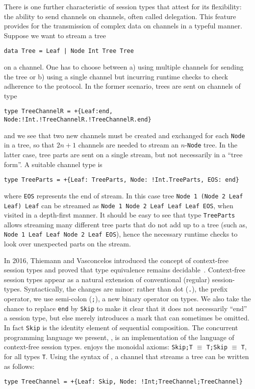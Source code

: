 There is one further characteristic of session types that attest for
its flexibility: the ability to send channels on channels, often called
delegation. This feature provides for the transmission of complex data
on channels in a typeful manner. Suppose we want to stream a tree
%
\begin{lstlisting}
data Tree = Leaf | Node Int Tree Tree
\end{lstlisting}
%
on a channel. One has to choose between a) using multiple channels for
sending the tree or b) using a single channel but incurring runtime
checks to check adherence to the protocol. In the former scenario,
trees are sent on channels of type
%
\begin{lstlisting}[morekeywords=end]
type TreeChannelR = +{Leaf:end, Node:!Int.!TreeChannelR.!TreeChannelR.end}
\end{lstlisting}
%
and we see that two new channels must be created and exchanged for
each \lstinline|Node| in a tree, so that $2n+1$ channels are needed to
stream an $n$-\lstinline|Node| tree.
%
In the latter case, tree parts are sent on a single stream, but not
necessarily in a ``tree form''. A suitable channel type is
%
\begin{lstlisting}[morekeywords=end]
type TreeParts = +{Leaf: TreeParts, Node: !Int.TreeParts, EOS: end}
\end{lstlisting}
%
where \lstinline|EOS| represents the end of stream. In this case tree
\lstinline|Node 1 (Node 2 Leaf Leaf) Leaf| can be streamed as
\lstinline|Node 1 Node 2 Leaf Leaf Leaf EOS|, when visited in a
depth-first manner. It should be easy to see that type
\lstinline|TreeParts| allows streaming many different tree parts that
do not add up to a tree (such as,
%
\lstinline|Node 1 Leaf Leaf Node 2 Leaf EOS|), hence the necessary
runtime checks to look over unexpected parts on the stream.

In 2016, Thiemann and Vasconcelos introduced the concept of
context-free session types and proved that type equivalence remains
decidable~\cite{DBLP:conf/icfp/ThiemannV16}.
%
Context-free session types appear as a natural extension of
conventional (regular) session-types. Syntactically, the changes are
minor: rather than dot (\lstinline|.|), the prefix operator, we use
semi-colon (\lstinline|;|), a new binary operator on types. We also
take the chance to replace \lstinline [morekeywords=end]|end| by
\lstinline|Skip| to make it clear that it does not necessarily ``end''
a session type, but else merely introduces a mark that can sometimes
be omitted. In fact \lstinline|Skip| is the identity element of
sequential composition. The concurrent programming language
we present, \freest, is an implementation of the
language of context-free session types.
\freest{} enjoys the monoidal axioms:
\lstinline|Skip;T| $\equiv$ \lstinline|T;Skip| $\equiv$ \lstinline|T|,
for all types \lstinline|T|.
%
Using the syntax of \freest, a channel that streams a tree can be
written as follows:
%
\begin{lstlisting}
type TreeChannel = +{Leaf: Skip, Node: !Int;TreeChannel;TreeChannel}
\end{lstlisting}

